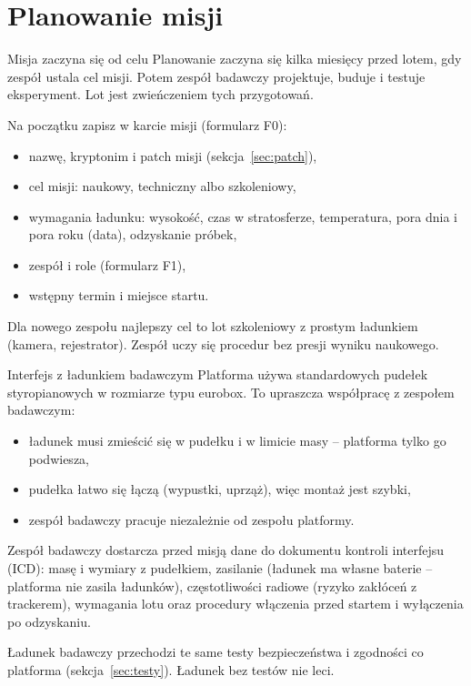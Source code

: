 \chapter{Planowanie misji}\label{ch:planowanie}

\begin{sekcja}{Misja zaczyna się od celu}\label{sec:cel}
Planowanie zaczyna się kilka miesięcy przed lotem, gdy zespół ustala cel misji. Potem zespół badawczy projektuje, buduje i testuje eksperyment. Lot jest zwieńczeniem tych przygotowań.

Na początku zapisz w karcie misji (formularz F0):
\begin{itemize}
  \item nazwę, kryptonim i patch misji (sekcja~\ref{sec:patch}),
  \item cel misji: naukowy, techniczny albo szkoleniowy,
  \item wymagania ładunku: wysokość, czas w stratosferze, temperatura, pora dnia i pora roku (data), odzyskanie próbek,
  \item zespół i role (formularz F1),
  \item wstępny termin i miejsce startu.
\end{itemize}

\begin{wskazowka}Dla nowego zespołu najlepszy cel to lot szkoleniowy z prostym ładunkiem (kamera, rejestrator). Zespół uczy się procedur bez presji wyniku naukowego.\end{wskazowka}
\end{sekcja}


\begin{sekcja}{Interfejs z ładunkiem badawczym}
Platforma używa standardowych pudełek styropianowych w rozmiarze typu eurobox. To upraszcza współpracę z zespołem badawczym:
\begin{itemize}
  \item ładunek musi zmieścić się w pudełku i w limicie masy -- platforma tylko go podwiesza,
  \item pudełka łatwo się łączą (wypustki, uprząż), więc montaż jest szybki,
  \item zespół badawczy pracuje niezależnie od zespołu platformy.
\end{itemize}

Zespół badawczy dostarcza przed misją dane do dokumentu kontroli interfejsu (ICD): masę i wymiary z pudełkiem, zasilanie (ładunek ma własne baterie -- platforma nie zasila ładunków), częstotliwości radiowe (ryzyko zakłóceń z trackerem), wymagania lotu oraz procedury włączenia przed startem i wyłączenia po odzyskaniu.

\begin{uwaga}Ładunek badawczy przechodzi te same testy bezpieczeństwa i zgodności co platforma (sekcja~\ref{sec:testy}). Ładunek bez testów nie leci.\end{uwaga}
\end{sekcja}

